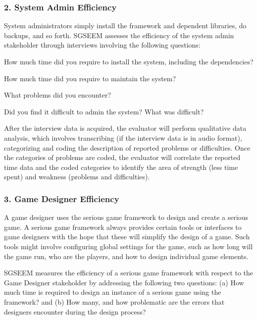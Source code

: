 \documentclass{sigchi}
\begin{document}
\subsubsection{2. System Admin Efficiency}

System administrators simply install the framework and dependent libraries, do backups,
and so forth. SGSEEM assesses the efficiency of the system admin stakeholder through
interviews involving the following questions:

\begin{compactitem}
\item How much time did you require to install the system, including the dependencies?
\item How much time did you require to maintain the system?
\item What problems did you encounter?
\item Did you find it difficult to admin the system? What was difficult?
\end{compactitem}

After the interview data is acquired, the evaluator will perform qualitative data
analysis, which involves transcribing (if the interview data is in audio format),
categorizing and coding the description of reported problems or difficulties.
Once the categories of problems are coded, the evaluator will correlate the reported time
data and the coded categories to identify the area of strength (less time spent) and
weakness (problems and difficulties).

\subsubsection{3. Game Designer Efficiency}

A game designer uses the serious game framework to design and create a serious game.
A serious game framework always provides certain tools or interfaces to game designers
with the hope that these will simplify the design of a game. Such tools might involve
configuring global settings for the game, such as how long will the game run, who are the
players, and how to design individual game elements.

SGSEEM measures the efficiency of a serious game framework with respect to the Game
Designer stakeholder by addressing the following two questions: (a) How much time is
required to design an instance of a serious game using the framework? and (b) How many,
and how problematic are the errors that designers encounter during the design process?
\end{document}
